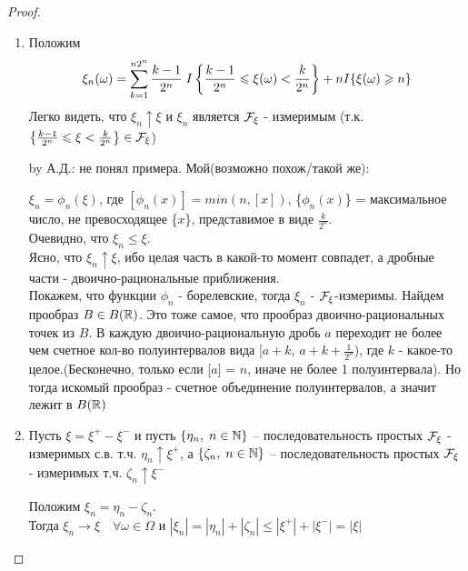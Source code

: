 \begin{proof}~
  \begin{enumerate}
    \item 
      Положим
      \begin{align*}
        \xi_n(\omega) = \sum_{k = 1}^{n 2^n} \frac{k - 1}{2^n} \;
        I \left\{  \frac{k - 1}{2^n} \leqslant \xi(\omega) < \frac{k}{2^n}  \right\} + n I\{\xi(\omega) \geqslant n\}
      \end{align*}
      Легко видеть, что $\xi_n \uparrow \xi$ и $\xi_n$ является $\mathcal{F}_\xi$ - измеримым
      (т.к. $\left\{ \frac{k - 1}{2^n} \leqslant \xi < \frac{k}{2^n} \right\} \in \mathcal{F}_\xi$)

	by А.Д.: не понял примера. Мой(возможно похож/такой же): 
	
	$\xi_n = \phi_{n}(\xi)$, где $[\phi_{n}(x)] = min(n,[x])$, \{$\phi_{n}(x)$\} = максимальное число, не превосходящее \{$x$\}, представимое в виде $\frac{k}{2^n}$. \\
	Очевидно, что $\xi_n \leq \xi$. \\
	Ясно, что $\xi_n \uparrow \xi$, ибо целая часть в какой-то момент совпадет, а дробные части - двоично-рациональные приближения. \\
	Покажем, что функции $\phi_n$ - борелевские, тогда $\xi_n$ - $\mathcal{F}_\xi$-измеримы.
	Найдем прообраз $B \in B(\mathbb{R})$. Это тоже самое, что прообраз двоично-рациональных точек из $B$. В каждую двоично-рациональную дробь $a$ переходит не более чем счетное кол-во полуинтервалов вида [$a + k$, $a + k + \frac{1}{2^n}$), где $k$ - какое-то целое.(Бесконечно, только если [$a$] = $n$, иначе не более 1 полуинтервала). Но тогда искомый прообраз - счетное объединение полуинтервалов, а значит лежит в $B(\mathbb{R})$

    \item 
      Пусть $\xi = \xi^+ - \xi^-$ и пусть $\{\eta_n,\; n \in \mathbb{N} \}$ -- последовательность
      простых $\mathcal{F}_\xi$ - измеримых с.в. т.ч. $\eta_n \uparrow \xi^+$, а
      $\{ \zeta_n,\; n \in \mathbb{N} \}$ -- последовательность простых $\mathcal{F}_\xi$ - измеримых
      т.ч. $\zeta_n \uparrow \xi^{-}$

      Положим $\xi_n = \eta_n - \zeta_n$.\\
      Тогда $\xi_n \to \xi \quad \forall \omega \in \Omega$ и 
      $|\xi_n| = |\eta_n| + |\zeta_n| \leq |\xi^+| + |\xi^-| = |\xi|$
   \end{enumerate}
\end{proof}


